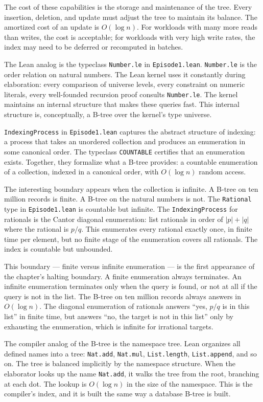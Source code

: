 The cost of these capabilities is the storage and maintenance of the tree.
Every insertion, deletion, and update must adjust the tree to maintain its
balance. The amortized cost of an update is $O(\log n)$. For workloads with
many more reads than writes, the cost is acceptable; for workloads with very
high write rates, the index may need to be deferred or recomputed in batches.

The Lean analog is the typeclass \texttt{Number.le} in \texttt{Episode1.lean}.
\texttt{Number.le} is the order relation on natural numbers. The Lean kernel
uses it constantly during elaboration: every comparison of universe levels,
every constraint on numeric literals, every well-founded recursion proof
consults \texttt{Number.le}. The kernel maintains an internal structure that
makes these queries fast. This internal structure is, conceptually, a B-tree
over the kernel's type universe.

\texttt{IndexingProcess} in \texttt{Episode1.lean} captures the abstract
structure of indexing: a process that takes an unordered collection and
produces an enumeration in some canonical order. The typeclass
\texttt{COUNTABLE} certifies that an enumeration exists. Together, they
formalize what a B-tree provides: a countable enumeration of a collection,
indexed in a canonical order, with $O(\log n)$ random access.

The interesting boundary appears when the collection is infinite. A B-tree on
ten million records is finite. A B-tree on the natural numbers is not. The
\texttt{Rational} type in \texttt{Episode1.lean} is countable but infinite.
The \texttt{IndexingProcess} for rationals is the Cantor diagonal enumeration:
list rationals in order of $|p| + |q|$ where the rational is $p/q$. This
enumerates every rational exactly once, in finite time per element, but no
finite stage of the enumeration covers all rationals. The index is countable
but unbounded.

This boundary --- finite versus infinite enumeration --- is the first
appearance of the chapter's halting boundary. A finite enumeration always
terminates. An infinite enumeration terminates only when the query is found,
or not at all if the query is not in the list. The B-tree on ten million
records always answers in $O(\log n)$. The diagonal enumeration of rationals
answers ``yes, $p/q$ is in this list'' in finite time, but answers ``no, the
target is not in this list'' only by exhausting the enumeration, which is
infinite for irrational targets.

The compiler analog of the B-tree is the namespace tree. Lean organizes all
defined names into a tree: \texttt{Nat.add}, \texttt{Nat.mul},
\texttt{List.length}, \texttt{List.append}, and so on. The tree is balanced
implicitly by the namespace structure. When the elaborator looks up the name
\texttt{Nat.add}, it walks the tree from the root, branching at each dot.
The lookup is $O(\log n)$ in the size of the namespace. This is the
compiler's index, and it is built the same way a database B-tree is built.

